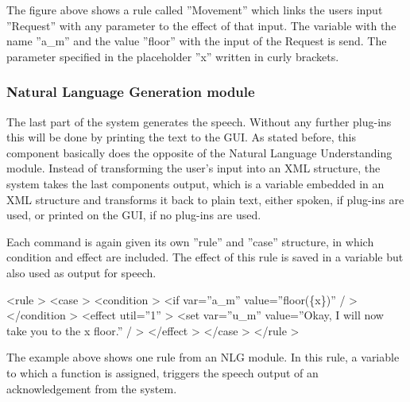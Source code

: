 \documentclass[a4paper, 12pt]{article}
\begin{document}
The figure above shows  a rule called ”Movement” which links the users input ”Request” with any parameter to the effect of that input.
The variable with the name ”a\_m” and the value ”floor” with the input of the Request is send.
The parameter specified in the placeholder ”x” written in curly brackets.
\subsubsection{Natural Language Generation module}
The last part of the system generates the speech.
Without any further plug-ins this will be done by printing the text to the GUI.
As stated before, this component basically does the opposite of the Natural Language Understanding module.
Instead of transforming the user's input into an XML structure, the system takes the last components output, which is a variable embedded in an XML structure and transforms it back to plain text, either spoken, if plug-ins are used, or printed on the GUI, if no plug-ins are used. \newline

Each command is again given its own ”rule” and ”case” structure, in which condition and effect are included.
The effect of this rule is saved in a variable but also used as output for speech. \newline

\textless rule \textgreater \newline
\indent \indent \textless case \textgreater \newline
\indent \indent \indent \textless condition \textgreater \newline
\indent \indent \indent \indent \textless if var=”a\_m” value=”floor(\{x\})” / \textgreater \newline
\indent \indent \indent \textless /condition \textgreater \newline
\indent \indent \indent \textless effect util=”1” \textgreater \newline
\indent \indent \indent \indent \textless set var=”u\_m” value=”Okay, I will now take you to the {x} floor.” / \textgreater \newline
\indent \indent \indent \textless /effect \textgreater \newline
\indent \indent\textless /case \textgreater \newline
\indent \textless /rule \textgreater \newline

The example above shows one rule from an NLG module.
In this rule, a variable to which a function  is assigned, triggers the speech output of an acknowledgement from the system.
\end{document}
